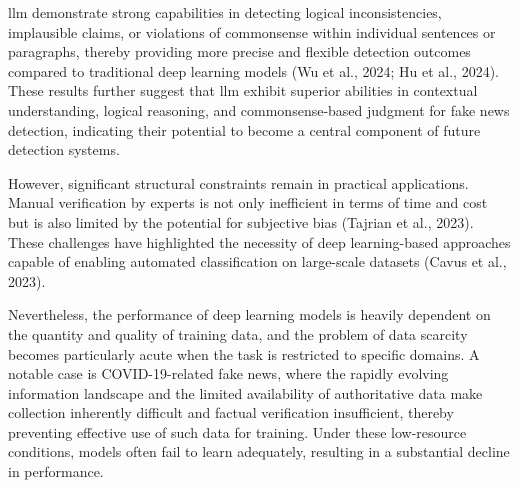 \documentclass[a4paper,fleqn]{cas-sc}
\begin{document}
\gls{llm} demonstrate strong capabilities in detecting logical inconsistencies, implausible claims, or violations of commonsense within individual sentences or paragraphs, thereby providing more precise and flexible detection outcomes compared to traditional deep learning models (Wu et al., 2024; Hu et al., 2024). These results further suggest that \gls{llm} exhibit superior abilities in contextual understanding, logical reasoning, and commonsense-based judgment for fake news detection, indicating their potential to become a central component of future detection systems.

However, significant structural constraints remain in practical applications. Manual verification by experts is not only inefficient in terms of time and cost but is also limited by the potential for subjective bias (Tajrian et al., 2023). These challenges have highlighted the necessity of deep learning-based approaches capable of enabling automated classification on large-scale datasets (Cavus et al., 2023). 

Nevertheless, the performance of deep learning models is heavily dependent on the quantity and quality of training data, and the problem of data scarcity becomes particularly acute when the task is restricted to specific domains. A notable case is COVID-19-related fake news, where the rapidly evolving information landscape and the limited availability of authoritative data make collection inherently difficult and factual verification insufficient, thereby preventing effective use of such data for training. Under these low-resource conditions, models often fail to learn adequately, resulting in a substantial decline in performance.
\end{document}
